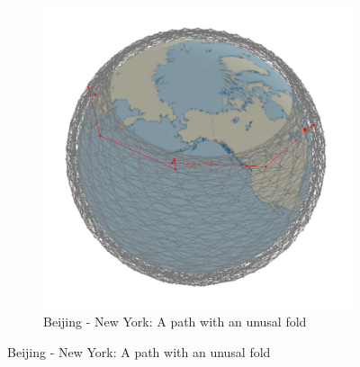 \documentclass[12pt,a4paper,twoside,openright]{report}
\begin{document}
\begin{figure}
	\begin{subfigure}[b]{\textwidth}
		\caption{Beijing - New York: A path with an unusal fold}
		\includegraphics[width=\textwidth]{NY-BJ-DistL-1}
	\end{subfigure}
\end{figure}
\end{document}
